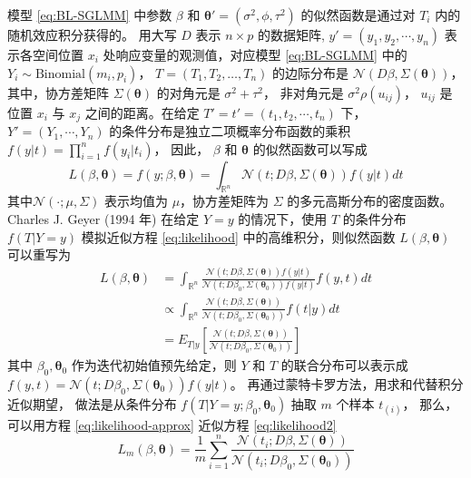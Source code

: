 \documentclass[12pt,a4paper,UTF8,twoside]{book}
\theoremstyle{definition}
\theoremstyle{definition}
\theoremstyle{definition}
\theoremstyle{remark}
\begin{document}
模型 \eqref{eq:BL-SGLMM} 中参数 \(\beta\) 和
\(\boldsymbol{\theta}' = (\sigma^2,\phi,\tau^2)\) 的似然函数是通过对
\(T_i\) 内的随机效应积分获得的。 用大写 \(D\) 表示 \(n\times p\)
的数据矩阵, \(y' = (y_1,y_2,\cdots,y_n)\) 表示各空间位置 \(x_i\)
处响应变量的观测值，对应模型 \eqref{eq:BL-SGLMM} 中的
\(Y_i \sim \mathrm{Binomial}(m_i,p_i)\)， \(T = (T_1,T_2,\ldots,T_n)\)
的边际分布是 \(\mathcal{N}(D\beta, \Sigma(\boldsymbol{\theta}))\)，
其中，协方差矩阵 \(\Sigma(\boldsymbol{\theta})\) 的对角元是
\(\sigma^2+\tau^2\)， 非对角元是 \(\sigma^2\rho(u_{ij})\)， \(u_{ij}\)
是位置 \(x_i\) 与 \(x_j\) 之间的距离。在给定
\(T'=t'=(t_1,t_2,\cdots,t_n)\) 下， \(Y'=(Y_1,\cdots,Y_n)\)
的条件分布是独立二项概率分布函数的乘积
\(f(y|t)=\prod_{i=1}^{n}f(y_{i}|t_{i})\)， 因此， \(\beta\) 和
\(\boldsymbol{\theta}\) 的似然函数可以写成 \begin{equation}
L(\beta,\boldsymbol{\theta}) = f(y;\beta,\boldsymbol{\theta}) = \int_{\mathbb{R}^{n}}\mathcal{N}(t;D\beta,\Sigma(\boldsymbol{\theta}))f(y|t)dt \label{eq:likelihood}
\end{equation} \noindent 其中\(\mathcal{N}(\cdot;\mu,\Sigma)\)
表示均值为 \(\mu\)，协方差矩阵为 \(\Sigma\)
的多元高斯分布的密度函数。Charles J. Geyer (1994 年)\citep{Geyer1994On}
在给定 \(Y=y\) 的情况下，使用 \(T\) 的条件分布 \(f(T|Y=y)\) 模拟近似方程
\eqref{eq:likelihood} 中的高维积分，则似然函数
\(L(\beta,\boldsymbol{\theta})\) 可以重写为 \begin{equation}
\begin{aligned}
L(\beta,\boldsymbol{\theta})
& = \int_{\mathbb{R}^{n}} \frac{\mathcal{N}(t;D\beta,\Sigma(\boldsymbol{\theta}))f(y|t)}{\mathcal{N}(t;D\beta_{0},\Sigma(\boldsymbol{\theta}_{0}))f(y|t)}f(y,t)dt \\
& \varpropto \int_{\mathbb{R}^{n}} \frac{\mathcal{N}(t;D\beta, \Sigma(\boldsymbol{\theta}))}{\mathcal{N}(t;D\beta_{0}, \Sigma(\boldsymbol{\theta}_{0}))}f(t|y)dt \\
&= E_{T|y}\left[\frac{\mathcal{N}(t; D\beta, \Sigma(\boldsymbol{\theta}))}{\mathcal{N}(t; D\beta_{0}, \Sigma(\boldsymbol{\theta}_{0}))}\right] 
\end{aligned} \label{eq:likelihood2}
\end{equation} \noindent 其中 \(\beta_{0},\boldsymbol{\theta}_{0}\)
作为迭代初始值预先给定，则 \(Y\) 和 \(T\) 的联合分布可以表示成
\(f(y,t) = \mathcal{N}(t; D\beta_{0}, \Sigma(\boldsymbol{\theta}_{0})) f(y|t)\)。
再通过蒙特卡罗方法，用求和代替积分近似期望， 做法是从条件分布
\(f(T|Y=y; \beta_0, \boldsymbol{\theta}_0)\) 抽取 \(m\) 个样本
\(t_{(i)}\)， 那么，可以用方程 \eqref{eq:likelihood-approx} 近似方程
\eqref{eq:likelihood2} \begin{equation}
L_{m}(\beta,\boldsymbol{\theta})=\frac{1}{m}\sum_{i=1}^{n}\frac{\mathcal{N}(t_{i};D\beta,\Sigma(\boldsymbol{\theta}))}{\mathcal{N}(t_{i};D\beta_{0},\Sigma(\boldsymbol{\theta}_{0}))} \label{eq:likelihood-approx}
\end{equation}
\end{document}
